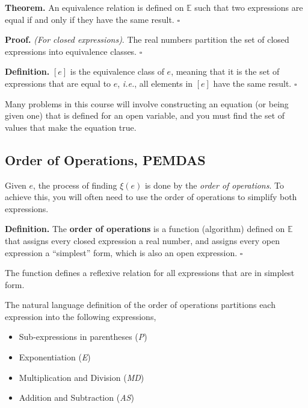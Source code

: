 \documentclass[letterpaper,twoside]{article}
\def\SmallHSpace{\hspace*{1mm}}
\newcommand\Ie[1]{\textit{i.e.}, #1}
\newcommand{\DefinedTerm}[1]{\textbf{#1}}
\newcommand{\Definition}[1]{%
    \emoji{book} \textbf{Definition.}\SmallHSpace #1 \hfill $\square$
}
\newcommand{\Theorem}[1]{%
    \emoji{thinking-face} \textbf{Theorem.}\SmallHSpace #1 \hfill $\square$
}
\newcommand{\Proof}[1]{%
    \emoji{brain} \textbf{Proof.}\SmallHSpace #1 \hfill $\square$
}
\newenvironment{SorrellItemize}
{
    \setlength\parskip{-5pt}
    \begin{itemize}[leftmargin=11pt]
        \setlength\itemsep{-4pt}
}{
    \end{itemize}
}
\begin{document}
\begin{multicols}{2}
\Theorem
{
    An equivalence relation is defined on $\mathbb{E}$ such that two expressions are equal if and only if they have the same result.
}

\Proof
{
    \textit{(For closed expressions)}.
    The real numbers partition the set of closed expressions into equivalence classes.
}

\Definition
{
   $[ e ]$ is the equivalence class of $e$, meaning that it is the set of expressions that are equal to $e$, \Ie{all elements in $[e]$ have the same result}.
}


Many problems in this course will involve constructing an equation (or being given one) that is defined for an open variable, and you must find the set of values that make the equation true.

\subsection{Order of Operations, PEMDAS}

Given $e$, the process of finding $\xi(e)$ is done by the \textit{order of operations}.
To achieve this, you will often need to use the order of operations to simplify both expressions.

\Definition
{
    The \DefinedTerm{order of operations} is a function (algorithm) defined on $\mathbb{E}$ that assigns every closed expression a real number, and assigns every open expression a ``simplest'' form, which is also an open expression.
}

The function defines a reflexive relation for all expressions that are in simplest form.

The natural language definition of the order of operations partitions each expression into the following expressions,
\begin{SorrellItemize}
    \item Sub-expressions in parentheses (\textit{P})
    \item Exponentiation (\textit{E})
    \item Multiplication and Division (\textit{MD})
    \item Addition and Subtraction (\textit{AS})
\end{SorrellItemize}




\end{multicols}
\end{document}
